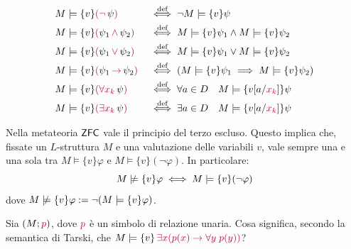 \begin{definition}
\begin{align*}
        &M \models \{v\} \textcolor{purple}{(\neg}\, \psi \textcolor{purple}{)} &&\overset{\text{def}}{\iff} \neg M \models \{v\} \psi \\
        &M \models \{v\} \textcolor{purple}{(} \psi_1 \,\textcolor{purple}{\land} \,\psi_2 \textcolor{purple}{)} &&\overset{\text{def}}{\iff} M \models \{v\} \psi_1 \land M \models \{v\} \psi_2 \\
        &M \models \{v\} \textcolor{purple}{(} \psi_1\, \textcolor{purple}{\lor}\, \psi_2 \textcolor{purple}{)} &&\overset{\text{def}}{\iff} M \models \{v\} \psi_1 \lor M \models \{v\} \psi_2 \\
        &M \models \{v\} \textcolor{purple}{(} \psi_1\, \textcolor{purple}{\to} \,\psi_2 \textcolor{purple}{)} &&\overset{\text{def}}{\iff} (M \models \{v\} \psi_1 \implies M \models \{v\} \psi_2) \\
        &M \models \{v\} \textcolor{purple}{(\forall x_k} \,\psi \textcolor{purple}{)} &&\overset{\text{def}}{\iff} \forall a \in D \quad M \models \{v[a/\textcolor{purple}{x_k}]\} \psi \\
        &M \models \{v\} \textcolor{purple}{(\exists x_k}\, \psi \textcolor{purple}{)} &&\overset{\text{def}}{\iff} \exists a \in D \quad M \models \{v[a/\textcolor{purple}{x_k}]\} \psi
    \end{align*}
\end{definition}

\begin{remark}
    Nella metateoria $\sf ZFC$ vale il principio del terzo escluso. Questo implica che, fissate un $L$-struttura $M$ e una valutazione delle variabili $v$, vale sempre una e una sola tra $M \models \{v\}\varphi$ e $M \models \{v\}(\neg \varphi)$. In particolare:
    \[M \nmodels \{v\}\varphi  \iff  M \models \{v\}(\neg \varphi)\]
    dove $M \nmodels \{v\}\varphi  := \neg (M \models \{v\}\varphi)$. 
\end{remark}

\begin{example}
    Sia $(M;\textcolor{purple}{p})$, dove $\textcolor{purple}{p}$ è un simbolo di relazione unaria. Cosa significa, secondo la semantica di Tarski, che $M \models \{v\}\,\textcolor{purple}{\exists x(p(x) \to \forall y \; p(y))}$?
\end{example}

